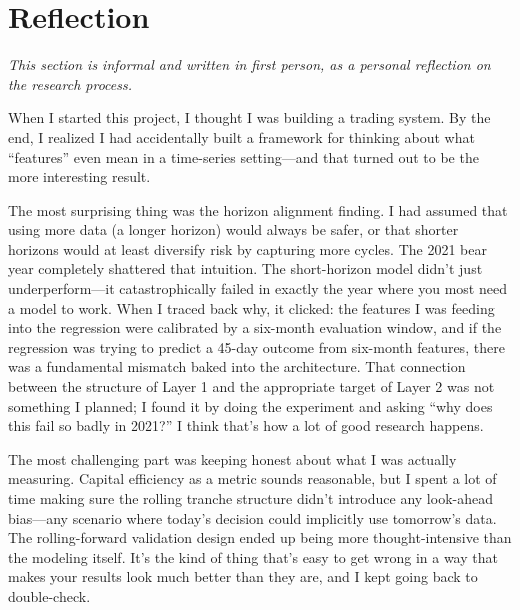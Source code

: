 \documentclass[11pt, letterpaper]{article}
\begin{document}
\clearpage



\clearpage
\section*{Reflection}

\textit{This section is informal and written in first person, as a personal
reflection on the research process.}

\bigskip

When I started this project, I thought I was building a trading system. By the
end, I realized I had accidentally built a framework for thinking about what
``features'' even mean in a time-series setting---and that turned out to be the
more interesting result.

The most surprising thing was the horizon alignment finding. I had assumed that
using more data (a longer horizon) would always be safer, or that shorter
horizons would at least diversify risk by capturing more cycles. The 2021 bear
year completely shattered that intuition. The short-horizon model didn't just
underperform---it catastrophically failed in exactly the year where you most
need a model to work. When I traced back why, it clicked: the features I was
feeding into the regression were calibrated by a six-month evaluation window,
and if the regression was trying to predict a 45-day outcome from six-month
features, there was a fundamental mismatch baked into the architecture. That
connection between the structure of Layer 1 and the appropriate target of
Layer 2 was not something I planned; I found it by doing the experiment and
asking ``why does this fail so badly in 2021?'' I think that's how a lot of
good research happens.

The most challenging part was keeping honest about what I was actually
measuring. Capital efficiency as a metric sounds reasonable, but I spent a lot
of time making sure the rolling tranche structure didn't introduce any
look-ahead bias---any scenario where today's decision could implicitly use
tomorrow's data. The rolling-forward validation design ended up being more
thought-intensive than the modeling itself. It's the kind of thing that's easy
to get wrong in a way that makes your results look much better than they are,
and I kept going back to double-check.
\end{document}
